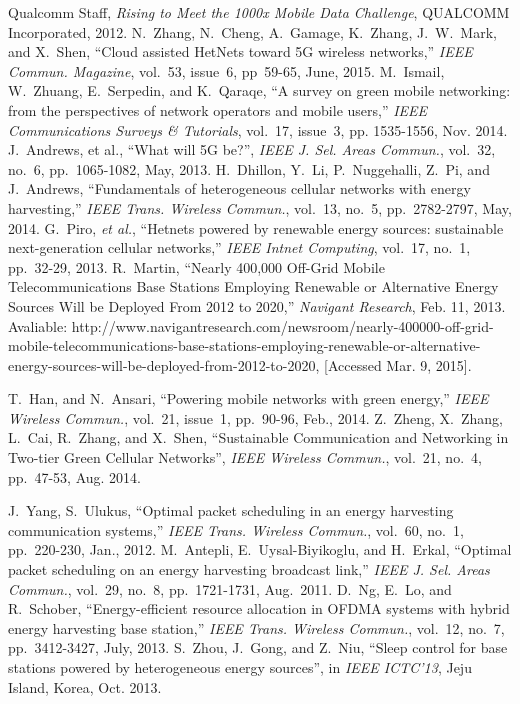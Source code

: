 \documentclass[12pt, draftclsnofoot,onecolumn]{IEEEtran}
\begin{document}
\begin{thebibliography}{100}

     Qualcomm Staff, \emph{Rising to Meet the 1000x Mobile Data Challenge}, QUALCOMM Incorporated, 2012.
     N.~Zhang, N.~Cheng, A.~Gamage, K.~Zhang, J.~W.~Mark, and X.~Shen, ``Cloud assisted HetNets toward 5G wireless networks,'' \emph{IEEE Commun. Magazine}, vol.~53, issue~6, pp~59-65, June, 2015.
     M.~Ismail, W.~Zhuang, E.~Serpedin, and K.~Qaraqe, ``A survey on green mobile networking: from the perspectives of network operators and mobile users,'' \emph{IEEE Communications Surveys \& Tutorials}, vol.~17, issue~3, pp. 1535-1556, Nov. 2014. 
     J.~Andrews, et al., ``What will 5G be?'', \emph{IEEE J. Sel. Areas Commun.}, vol.~32, no.~6, pp.~1065-1082, May, 2013.
     H.~Dhillon, Y.~Li, P.~Nuggehalli, Z.~Pi, and J.~Andrews, ``Fundamentals of heterogeneous cellular networks with energy harvesting,'' \emph{IEEE Trans. Wireless Commun.}, vol.~13, no.~5, pp.~2782-2797, May, 2014.
     G.~Piro, \emph{et al.}, ``Hetnets powered by renewable energy sources: sustainable next-generation cellular networks,'' \emph{IEEE Intnet Computing}, vol.~17, no.~1, pp.~32-29, 2013.
     R.~Martin, ``Nearly 400,000 Off-Grid Mobile Telecommunications Base Stations Employing Renewable or Alternative Energy Sources Will be Deployed From 2012 to 2020,'' \emph{Navigant Research}, Feb. 11, 2013. Avaliable: http://www.navigantresearch.com/newsroom/nearly-400000-off-grid-mobile-telecommunications-base-stations-employing-renewable-or-alternative-energy-sources-will-be-deployed-from-2012-to-2020, [Accessed Mar. 9, 2015].

     T.~Han, and N.~Ansari, ``Powering mobile networks with green energy,'' \emph{IEEE Wireless Commun.}, vol.~21, issue~1, pp.~90-96, Feb., 2014.
     Z.~Zheng, X.~Zhang, L.~Cai, R.~Zhang, and X.~Shen, ``Sustainable Communication and Networking in Two-tier Green Cellular Networks'', \emph{IEEE Wireless Commun.}, vol.~21, no.~4, pp.~47-53, Aug. 2014.

     J.~Yang, S.~Ulukus, ``Optimal packet scheduling in an energy harvesting communication systems,'' \emph{IEEE Trans. Wireless Commun.}, vol.~60, no.~1, pp.~220-230, Jan., 2012.
     M.~Antepli, E.~Uysal-Biyikoglu, and H.~Erkal, ``Optimal packet scheduling on an energy harvesting broadcast link,'' \emph{IEEE J. Sel. Areas Commun.}, vol.~29, no.~8, pp.~1721-1731, Aug.~2011.
     D.~Ng, E.~Lo, and R.~Schober, ``Energy-efficient resource allocation in OFDMA systems with hybrid energy harvesting base station,'' \emph{IEEE Trans. Wireless Commun.}, vol.~12, no.~7, pp.~3412-3427, July, 2013.
     S.~Zhou, J.~Gong, and Z.~Niu, ``Sleep control for base stations powered by heterogeneous energy sources'', in \emph{IEEE ICTC'13}, Jeju Island, Korea, Oct. 2013.


\end{thebibliography}
\end{document}
